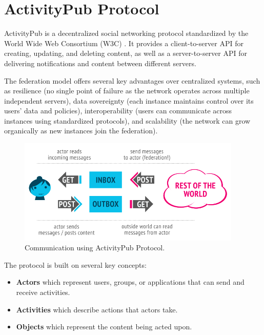 \section{ActivityPub Protocol}
ActivityPub is a decentralized social networking protocol standardized by the World Wide Web Consortium (W3C) \cite{ActivityPub}. It provides a client-to-server API for creating, updating, and deleting content, as well as a server-to-server API for delivering notifications and content between different servers. 

The federation model offers several key advantages over centralized systems, such as resilience (no single point of failure as the network operates across multiple independent servers), data sovereignty (each instance maintains control over its users' data and policies), interoperability (users can communicate across instances using standardized protocols), and scalability (the network can grow organically as new instances join the federation).
\begin{figure}[h]
  \centering
    \includegraphics[width=0.95\textwidth]{Graphics/activitypubexample.png} %
    \caption{Communication using ActivityPub Protocol.}
    \label{fig:example}
\end{figure}

 The protocol is built on several key concepts:

\begin{itemize}
  \item \textbf{Actors} which represent users, groups, or applications that can send and receive activities.
  \item \textbf{Activities} which describe actions that actors take.
  \item \textbf{Objects} which represent the content being acted upon.
\end{itemize}

